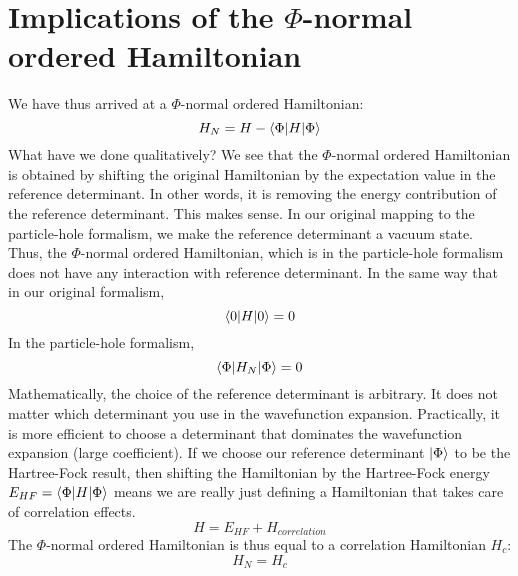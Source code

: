 \documentclass{article}
\newcommand{\kphi}{\ensuremath{\ket{\Phi}} }
\begin{document}
 \section{Implications of the $\Phi$-normal ordered Hamiltonian}
 We have thus arrived at a $\Phi$-normal ordered Hamiltonian:
 \[ H_N =  H-  \braket{\Phi |H|\Phi}\]
What have we done qualitatively? 
We see that the $\Phi$-normal ordered Hamiltonian is obtained by shifting the original Hamiltonian by the expectation value in the reference determinant. 
In other words, it is removing the energy contribution of the reference determinant. 
This makes sense. 
In our original mapping to the particle-hole formalism, we make the reference determinant a vacuum state. 
Thus, the $\Phi$-normal ordered Hamiltonian, which is in the particle-hole formalism does not have any interaction with reference determinant.
In the same way that in our original formalism,
\[\braket{0| H | 0} = 0\]
In the particle-hole formalism, 
\[\braket{\Phi| H_N | \Phi} = 0\]
 Mathematically, the choice of the reference determinant is arbitrary. It does not matter which determinant you use in the wavefunction expansion.
 Practically, it is more efficient to choose a determinant that dominates the wavefunction expansion (large coefficient). 
 If we choose our reference determinant \kphi to be the Hartree-Fock result, then shifting the Hamiltonian by the Hartree-Fock
 energy $E_{HF} = \braket{\Phi |H|\Phi}$ means we are really just defining a Hamiltonian that takes care of correlation effects. 
\[H = E_{HF} + H_{correlation} \]
 The $\Phi$-normal ordered Hamiltonian is thus equal to a correlation Hamiltonian $H_c$: 
 \[H_N = H_c \]
\end{document}
